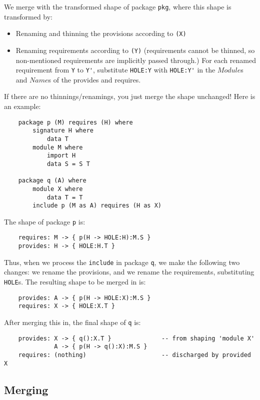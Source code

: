 \documentclass{article}
\newcommand{\I}[1]{\ensuremath{\mathit{#1}}}
\begin{document}
We merge with the transformed shape of package \verb|pkg|, where this
shape is transformed by:

\begin{itemize}
    \item Renaming and thinning the provisions according to \verb|(X)|
    \item Renaming requirements according to \verb|(Y)| (requirements cannot
          be thinned, so non-mentioned requirements are implicitly passed through.)
          For each renamed requirement from \verb|Y| to \verb|Y'|,
          substitute \verb|HOLE:Y| with \verb|HOLE:Y'| in the
          \I{Module}s and \I{Name}s of the provides and requires.
\end{itemize}
%
If there are no thinnings/renamings, you just merge the
shape unchanged! Here is an example:

\begin{verbatim}
    package p (M) requires (H) where
        signature H where
            data T
        module M where
            import H
            data S = S T

    package q (A) where
        module X where
            data T = T
        include p (M as A) requires (H as X)
\end{verbatim}
%
The shape of package \verb|p| is:

\begin{verbatim}
    requires: M -> { p(H -> HOLE:H):M.S }
    provides: H -> { HOLE:H.T }
\end{verbatim}
%
Thus, when we process the \verb|include| in package \verb|q|,
we make the following two changes: we rename the provisions,
and we rename the requirements, substituting \verb|HOLE|s.
The resulting shape to be merged in is:

\begin{verbatim}
    provides: A -> { p(H -> HOLE:X):M.S }
    requires: X -> { HOLE:X.T }
\end{verbatim}
%
After merging this in, the final shape of \verb|q| is:

\begin{verbatim}
    provides: X -> { q():X.T }              -- from shaping 'module X'
              A -> { p(H -> q():X):M.S }
    requires: (nothing)                     -- discharged by provided X
\end{verbatim}

\newpage

\subsection{Merging}
\end{document}
